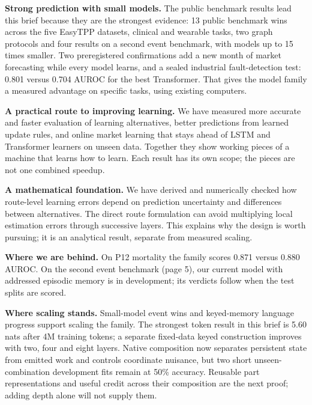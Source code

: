 \documentclass[10pt, a4 paper]{article}
\begin{document}
\begin{tile}
\textbf{Strong prediction with small models.} The public benchmark results lead
this brief because they are the strongest evidence: 13 public benchmark wins across
the five EasyTPP datasets, clinical and wearable tasks, two graph protocols and four results on a second event benchmark,
with models up to 15 times smaller. Two preregistered confirmations add a new
month of market forecasting while every model learns, and a sealed industrial
fault-detection test: 0.801 versus 0.704 AUROC for the best Transformer. That gives the model family a measured
advantage on specific tasks, using existing computers.
\end{tile}

\begin{tile}
\textbf{A practical route to improving learning.} We have measured more accurate
and faster evaluation of learning alternatives, better predictions from learned
update rules, and online market learning that stays ahead of LSTM and Transformer
learners on unseen data. Together they show working pieces of a machine that learns how
to learn. Each result has its own scope; the pieces are not one combined speedup.
\end{tile}

\begin{tile}
\textbf{A mathematical foundation.} We have derived and numerically checked how
route-level learning errors depend on prediction uncertainty and differences
between alternatives. The direct route formulation can avoid multiplying local
estimation errors through successive layers. This explains why the design is
worth pursuing; it is an analytical result, separate from measured scaling.
\end{tile}

\vspace{3mm}
\textbf{Where we are behind.} On P12 mortality the family scores 0.871 versus 0.880 AUROC.
On the second event benchmark (page 5), our current model with addressed episodic memory is in development; its verdicts follow when the test splits are scored.

\textbf{Where scaling stands.} Small-model event wins and keyed-memory language progress support
scaling the family. The strongest token result in this brief is 5.60 nats after 4M training tokens;
a separate fixed-data keyed construction improves with two, four and eight layers. Native composition
now separates persistent state from emitted work and controls coordinate nuisance, but two short
unseen-combination development fits remain at 50\% accuracy. Reusable part representations and useful
credit across their composition are the next proof; adding depth alone will not supply them.
\end{document}
